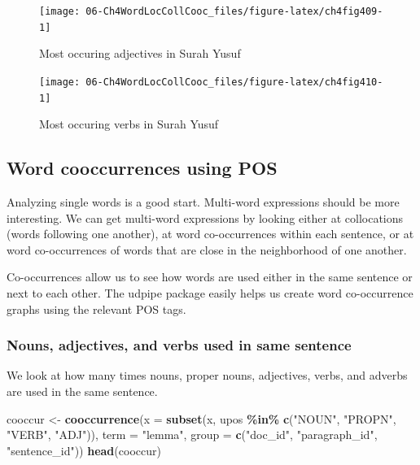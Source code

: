 \documentclass[
]{article}
\newenvironment{Shaded}{\begin{snugshade}}{\end{snugshade}}
\newcommand{\AttributeTok}[1]{\textcolor[rgb]{0.13,0.29,0.53}{#1}}
\newcommand{\FunctionTok}[1]{\textcolor[rgb]{0.13,0.29,0.53}{\textbf{#1}}}
\newcommand{\NormalTok}[1]{#1}
\newcommand{\OtherTok}[1]{\textcolor[rgb]{0.56,0.35,0.01}{#1}}
\newcommand{\SpecialCharTok}[1]{\textcolor[rgb]{0.81,0.36,0.00}{\textbf{#1}}}
\newcommand{\StringTok}[1]{\textcolor[rgb]{0.31,0.60,0.02}{#1}}
\begin{document}
\begin{figure}

{\centering \texttt{[image: 06-Ch4WordLocCollCooc\_files/figure-latex/ch4fig409-1]} 

}

\caption{Most occuring adjectives in Surah Yusuf}\label{fig:ch4fig409}
\end{figure}

\begin{figure}

{\centering \texttt{[image: 06-Ch4WordLocCollCooc\_files/figure-latex/ch4fig410-1]} 

}

\caption{Most occuring verbs in Surah Yusuf}\label{fig:ch4fig410}
\end{figure}

\hypertarget{word-cooccurrences-using-POS}{%
\subsection{Word cooccurrences using POS}\label{word-cooccurrences-using-POS}}

Analyzing single words is a good start. Multi-word expressions should be more interesting. We can get multi-word expressions by looking either at collocations (words following one another), at word co-occurrences within each sentence, or at word co-occurrences of words that are close in the neighborhood of one another.

Co-occurrences allow us to see how words are used either in the same sentence or next to each other. The udpipe package easily helps us create word co-occurrence graphs using the relevant POS tags.

\hypertarget{nouns-adjectives-and-verbs-used-in-same-sentence}{%
\subsubsection{Nouns, adjectives, and verbs used in same sentence}\label{nouns-adjectives-and-verbs-used-in-same-sentence}}

We look at how many times nouns, proper nouns, adjectives, verbs, and adverbs are used in the same sentence.

\footnotesize

\begin{Shaded}
\begin{Highlighting}[]
\NormalTok{cooccur }\OtherTok{\textless{}{-}} \FunctionTok{cooccurrence}\NormalTok{(}\AttributeTok{x =} \FunctionTok{subset}\NormalTok{(x, upos }\SpecialCharTok{\%in\%} \FunctionTok{c}\NormalTok{(}\StringTok{"NOUN"}\NormalTok{, }\StringTok{"PROPN"}\NormalTok{, }\StringTok{"VERB"}\NormalTok{, }\StringTok{"ADJ"}\NormalTok{)), }
                     \AttributeTok{term =} \StringTok{"lemma"}\NormalTok{, }
                     \AttributeTok{group =} \FunctionTok{c}\NormalTok{(}\StringTok{"doc\_id"}\NormalTok{, }\StringTok{"paragraph\_id"}\NormalTok{, }\StringTok{"sentence\_id"}\NormalTok{))}
\FunctionTok{head}\NormalTok{(cooccur)}
\end{Highlighting}
\end{Shaded}
\end{document}
